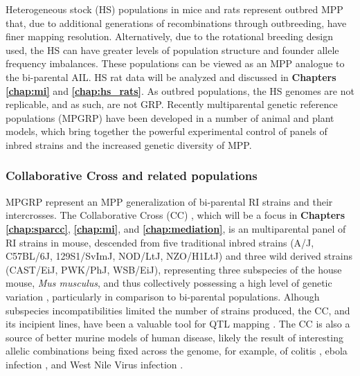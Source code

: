 Heterogeneous stock (HS) populations in mice \citep{Valdar2006a} and rats \citep{Hansen1984} represent outbred MPP that, due to additional generations of recombinations through outbreeding, have finer mapping resolution. Alternatively, due to the rotational breeding design used, the HS can have greater levels of population structure and founder allele frequency imbalances. These populations can be viewed as an MPP analogue to the bi-parental AIL. HS rat data will be analyzed and discussed in \textbf{Chapters \ref{chap:mi}} and \textbf{\ref{chap:hs_rats}}. As outbred populations, the HS genomes are not replicable, and as such, are not GRP. Recently multiparental genetic reference populations (MPGRP) have been developed in a number of animal and plant models, which bring together the powerful experimental control of panels of inbred strains and the increased genetic diversity of MPP.

\subsubsection{Collaborative Cross and related populations}

MPGRP represent an MPP generalization of bi-parental RI strains and their intercrosses. The Collaborative Cross (CC) \citep{Churchill2004,Hall2012,Srivastava2017}, which will be a focus in \textbf{Chapters \ref{chap:sparcc}}, \textbf{\ref{chap:mi}}, and \textbf{\ref{chap:mediation}}, is an multiparental panel of RI strains in mouse, descended from five traditional inbred strains (A/J, C57BL/6J, 129S1/SvImJ, NOD/LtJ, NZO/H1LtJ) and three wild derived strains (CAST/EiJ, PWK/PhJ, WSB/EiJ), representing three subspecies of the house mouse, \textit{Mus musculus}, and thus collectively possessing a high level of genetic variation \citep{Yang2007,Yang2011}, particularly in comparison to bi-parental populations. Alhough subspecies incompatibilities \citep{Shorter2017} limited the number of strains produced, the CC, and its incipient lines, have been a valuable tool for QTL mapping \citep{Aylor2011, Phillippi2014,Kelada2016,Mosedale2017,Donoghue2017}. The CC is also a source of better murine models of human disease, likely the result of interesting allelic combinations being fixed across the genome, for example, of colitis \citep{Rogala2014}, ebola infection \citep{Rasmussen2014}, and West Nile Virus infection \citep{Graham2015}.

